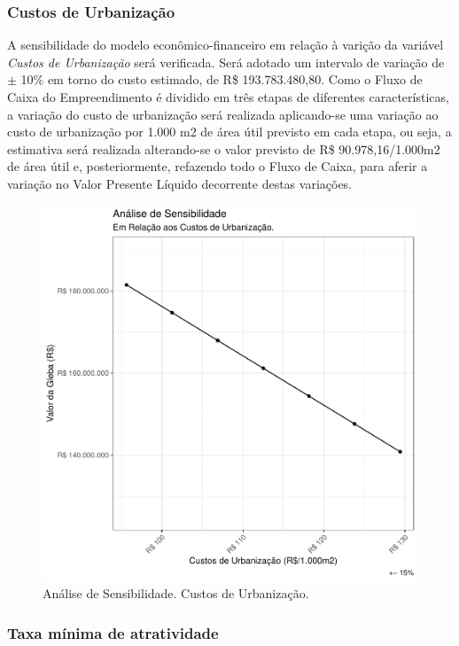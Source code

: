 \documentclass[
  10pt,
  a4paper]{article}
\begin{document}
\subsubsection*{Custos de
Urbanização}\label{custos-de-urbanizauxe7uxe3o-1}

A sensibilidade do modelo econômico-financeiro em relação à varição da
variável \emph{Custos de Urbanização} será verificada. Será adotado um
intervalo de variação de \(\pm\) 10\% em torno do custo estimado, de R\$
193.783.480,80. Como o Fluxo de Caixa do Empreendimento é dividido em
três etapas de diferentes características, a variação do custo de
urbanização será realizada aplicando-se uma variação ao custo de
urbanização por 1.000 m2 de área útil previsto em cada etapa, ou seja, a
estimativa será realizada alterando-se o valor previsto de R\$
90.978,16/1.000m2 de área útil e, posteriormente, refazendo todo o Fluxo
de Caixa, para aferir a variação no Valor Presente Líquido decorrente
destas variações.

\begin{figure}[H]

{\centering \includegraphics[width=0.7\linewidth]{images/SensCUrb-1} 

}

\caption{Análise de Sensibilidade. Custos de Urbanização.}\label{fig:SensCUrb}
\end{figure}

\subsubsection*{Taxa mínima de
atratividade}\label{taxa-muxednima-de-atratividade}
\end{document}
